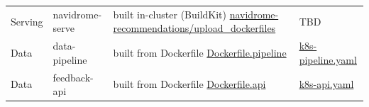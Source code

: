\documentclass[11pt,a4paper]{article}
\begin{document}
\begin{longtable}{@{} p{1.5cm} p{2.6cm} p{4.8cm} p{4.4cm} @{}}
Serving &
navidrome-serve &
built in-cluster (BuildKit) \newline
\href{https://github.com/vanshika2022/navidrome-recommendations/tree/main/upload_dockerfiles}{navidrome-recommendations/upload\_dockerfiles} &
TBD \\[8pt]

Data &
data-pipeline &
built from Dockerfile \newline
\href{https://github.com/hashirmuzaffar/navidrome-mlops-data-proj05/blob/main/docker/Dockerfile.pipeline}{Dockerfile.pipeline} &
\href{https://github.com/hashirmuzaffar/navidrome-mlops-data-proj05/blob/main/docker/k8s-pipeline.yaml}{k8s-pipeline.yaml} \\[8pt]

Data &
feedback-api &
built from Dockerfile \newline
\href{https://github.com/hashirmuzaffar/navidrome-mlops-data-proj05/blob/main/docker/Dockerfile.api}{Dockerfile.api} &
\href{https://github.com/hashirmuzaffar/navidrome-mlops-data-proj05/blob/main/docker/k8s-api.yaml}{k8s-api.yaml} \\

\end{longtable}
\end{document}
